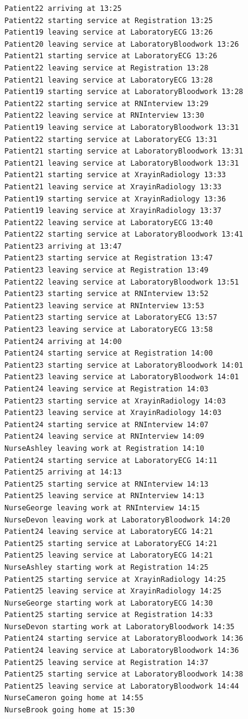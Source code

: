 \documentclass[12pt]{article}
\begin{document}
\begin{verbatim}
		Patient22 arriving at 13:25
		Patient22 starting service at Registration 13:25
		Patient19 leaving service at LaboratoryECG 13:26
		Patient20 leaving service at LaboratoryBloodwork 13:26
		Patient21 starting service at LaboratoryECG 13:26
		Patient22 leaving service at Registration 13:28
		Patient21 leaving service at LaboratoryECG 13:28
		Patient19 starting service at LaboratoryBloodwork 13:28
		Patient22 starting service at RNInterview 13:29
		Patient22 leaving service at RNInterview 13:30
		Patient19 leaving service at LaboratoryBloodwork 13:31
		Patient22 starting service at LaboratoryECG 13:31
		Patient21 starting service at LaboratoryBloodwork 13:31
		Patient21 leaving service at LaboratoryBloodwork 13:31
		Patient21 starting service at XrayinRadiology 13:33
		Patient21 leaving service at XrayinRadiology 13:33
		Patient19 starting service at XrayinRadiology 13:36
		Patient19 leaving service at XrayinRadiology 13:37
		Patient22 leaving service at LaboratoryECG 13:40
		Patient22 starting service at LaboratoryBloodwork 13:41
		Patient23 arriving at 13:47
		Patient23 starting service at Registration 13:47
		Patient23 leaving service at Registration 13:49
		Patient22 leaving service at LaboratoryBloodwork 13:51
		Patient23 starting service at RNInterview 13:52
		Patient23 leaving service at RNInterview 13:53
		Patient23 starting service at LaboratoryECG 13:57
		Patient23 leaving service at LaboratoryECG 13:58
		Patient24 arriving at 14:00
		Patient24 starting service at Registration 14:00
		Patient23 starting service at LaboratoryBloodwork 14:01
		Patient23 leaving service at LaboratoryBloodwork 14:01
		Patient24 leaving service at Registration 14:03
		Patient23 starting service at XrayinRadiology 14:03
		Patient23 leaving service at XrayinRadiology 14:03
		Patient24 starting service at RNInterview 14:07
		Patient24 leaving service at RNInterview 14:09
		NurseAshley leaving work at Registration 14:10
		Patient24 starting service at LaboratoryECG 14:11
		Patient25 arriving at 14:13
		Patient25 starting service at RNInterview 14:13
		Patient25 leaving service at RNInterview 14:13
		NurseGeorge leaving work at RNInterview 14:15
		NurseDevon leaving work at LaboratoryBloodwork 14:20
		Patient24 leaving service at LaboratoryECG 14:21
		Patient25 starting service at LaboratoryECG 14:21
		Patient25 leaving service at LaboratoryECG 14:21
		NurseAshley starting work at Registration 14:25
		Patient25 starting service at XrayinRadiology 14:25
		Patient25 leaving service at XrayinRadiology 14:25
		NurseGeorge starting work at LaboratoryECG 14:30
		Patient25 starting service at Registration 14:33
		NurseDevon starting work at LaboratoryBloodwork 14:35
		Patient24 starting service at LaboratoryBloodwork 14:36
		Patient24 leaving service at LaboratoryBloodwork 14:36
		Patient25 leaving service at Registration 14:37
		Patient25 starting service at LaboratoryBloodwork 14:38
		Patient25 leaving service at LaboratoryBloodwork 14:44
		NurseCameron going home at 14:55
		NurseBrook going home at 15:30
		\end{verbatim}
		
\end{document}
